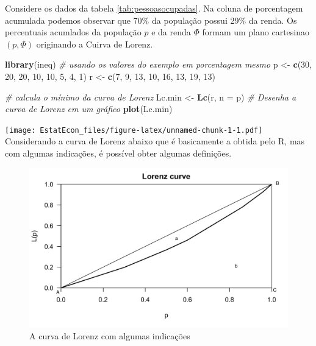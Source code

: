 \documentclass[
]{book}
\newenvironment{Shaded}{\begin{snugshade}}{\end{snugshade}}
\newcommand{\CommentTok}[1]{\textcolor[rgb]{0.56,0.35,0.01}{\textit{#1}}}
\newcommand{\DataTypeTok}[1]{\textcolor[rgb]{0.13,0.29,0.53}{#1}}
\newcommand{\DecValTok}[1]{\textcolor[rgb]{0.00,0.00,0.81}{#1}}
\newcommand{\KeywordTok}[1]{\textcolor[rgb]{0.13,0.29,0.53}{\textbf{#1}}}
\newcommand{\NormalTok}[1]{#1}
\newcommand{\StringTok}[1]{\textcolor[rgb]{0.31,0.60,0.02}{#1}}
\begin{document}
Considere os dados da tabela \ref{tab:pessoasocupadas}. Na coluna de porcentagem acumulada podemos observar que 70\% da população possui 29\% da renda. Os percentuais acumlados da população \(p\) e da renda \(\Phi\) formam um plano cartesinao \((p,\Phi)\) originando a Cuirva de Lorenz.

\begin{Shaded}
\begin{Highlighting}[]
\KeywordTok{library}\NormalTok{(ineq)}
\CommentTok{# usando os valores do exemplo em porcentagem mesmo}
\NormalTok{p <-}\StringTok{ }\KeywordTok{c}\NormalTok{(}\DecValTok{30}\NormalTok{, }\DecValTok{20}\NormalTok{, }\DecValTok{20}\NormalTok{, }\DecValTok{10}\NormalTok{, }\DecValTok{10}\NormalTok{, }\DecValTok{5}\NormalTok{, }\DecValTok{4}\NormalTok{, }\DecValTok{1}\NormalTok{)}
\NormalTok{r <-}\StringTok{ }\KeywordTok{c}\NormalTok{(}\DecValTok{7}\NormalTok{, }\DecValTok{9}\NormalTok{, }\DecValTok{13}\NormalTok{, }\DecValTok{10}\NormalTok{, }\DecValTok{16}\NormalTok{, }\DecValTok{13}\NormalTok{, }\DecValTok{19}\NormalTok{, }\DecValTok{13}\NormalTok{)}

\CommentTok{# calcula o mínimo da curva de Lorenz}
\NormalTok{Lc.min <-}\StringTok{ }\KeywordTok{Lc}\NormalTok{(r, }\DataTypeTok{n =}\NormalTok{ p)}
\CommentTok{# Desenha a curva de Lorenz em um gráfico}
\KeywordTok{plot}\NormalTok{(Lc.min)}
\end{Highlighting}
\end{Shaded}

\texttt{[image: EstatEcon\_files/figure-latex/unnamed-chunk-1-1.pdf]}
Considerando a curva de Lorenz abaixo que é basicamente a obtida pelo R, mas com algumas indicações, é possível obter algumas definições.

\begin{figure}
\centering
\includegraphics{lorenz3.png}
\caption{A curva de Lorenz com algumas indicações}
\end{figure}
\end{document}
